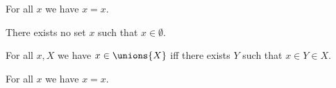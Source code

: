 \begin{axiom}\label{trivial}
    For all $x$ we have $x = x$.
\end{axiom}

\begin{axiom}\label{empty_axiom}
    There exists no set $x$ such that $x\in\emptyset$.
\end{axiom}

\begin{axiom}\label{union_eq}
    For all $x, X$ we have $x\in\unions{X}$ iff there exists $Y$ such that $x\in Y\in X$.
\end{axiom}

\begin{theorem}\label{eq_refl}
    For all $x$ we have $x=x$.
\end{theorem}
